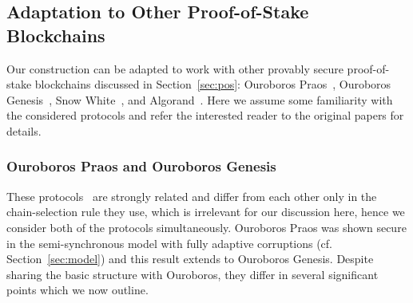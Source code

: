 \subsection{Adaptation to Other Proof-of-Stake Blockchains}
\label{section:other}


Our construction can be adapted to work with other provably secure
proof-of-stake blockchains discussed in Section~\ref{sec:pos}:
Ouroboros Praos~\cite{praos},
Ouroboros Genesis~\cite{genesis},
Snow White~\cite{snowwhite}, and
Algorand~\cite{algorand}.
Here we assume some familiarity with the
considered protocols and refer the interested reader to the original papers for
details.

\subsubsection{Ouroboros Praos and Ouroboros Genesis}

These protocols~\cite{praos,genesis} are strongly related and differ from each
other only in the chain-selection
rule they use, which is irrelevant for our discussion here, hence we
consider both of the protocols simultaneously.
Ouroboros Praos was shown secure in the
semi-synchronous model with fully adaptive corruptions (cf.
Section~\ref{sec:model}) and this result extends to Ouroboros Genesis.
Despite sharing the basic structure with Ouroboros,
they differ in several significant points which we now outline.

